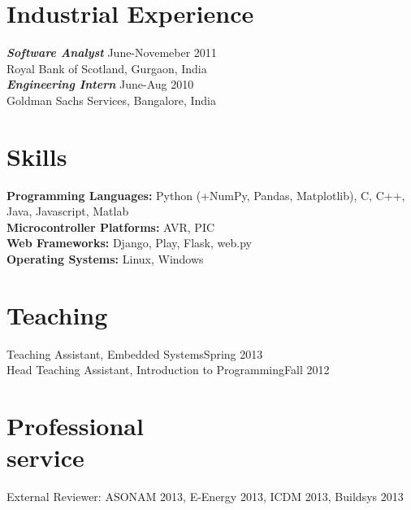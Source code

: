 \documentclass[margin]{res}
\begin{document}
\begin{resume}
                
\section{Industrial Experience} {\sl \textbf{Software Analyst}}  \hfill June-Novemeber 2011\\
							Royal Bank of Scotland, Gurgaon, India\\
							{\sl \textbf{Engineering Intern}}  \hfill June-Aug 2010\\
								Goldman Sachs Services, Bangalore, India              
								
\section{Skills} \textbf{Programming Languages: } Python (+NumPy, Pandas, Matplotlib), C, C++, Java, Javascript, Matlab\\
				\textbf{Microcontroller Platforms: } AVR, PIC\\
				\textbf{Web Frameworks: } Django, Play, Flask, web.py\\
				\textbf{Operating Systems: } Linux, Windows
				              
\section{Teaching}  Teaching Assistant, Embedded Systems\hfill Spring 2013	\\
					Head Teaching Assistant, Introduction to Programming\hfill Fall 2012	\\
					
\section{Professional\\service} External Reviewer: ASONAM 2013, E-Energy 2013, ICDM 2013, Buildsys 2013
				





\end{resume}
\end{document}
